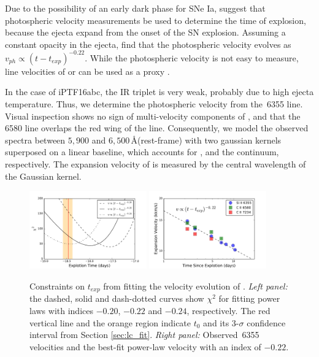 \documentclass[twocolumn]{aastex61}
\begin{document}
Due to the possibility of an early dark phase for SNe Ia, \citet{2014ApJ...784...85P} suggest that photospheric velocity measurements be used to determine the time of explosion, because the ejecta expand from the onset of the SN explosion. Assuming a
constant opacity in the ejecta, \citeauthor{2014ApJ...784...85P} find that the photospheric velocity evolves as
$v_{ph}\propto(t-t_{exp})^{-0.22}$. While the photospheric velocity
is not easy to measure, line velocities of  or 
can be used as a proxy
\citep{2014ApJ...784...85P,2016ApJ...826..144S}.

In the case of iPTF16abc, the  IR triplet is very weak, 
probably due to high ejecta temperature. Thus, we
determine the photospheric velocity from the \,6355 line. Visual
inspection shows no sign of multi-velocity components
of , and that the \,6580 line overlaps the red
wing of the  line. Consequently, we model the observed 
spectra between $5,900$ and $6,500$\,\AA (rest-frame)
with two gaussian kernels superposed on a linear baseline, which
accounts for ,  and the
continuum, respectively. The expansion
velocity of  is measured by the central wavelength
of the  Gaussian kernel.

\begin{figure}[!thb]
  \centering
  \includegraphics[width=0.45\textwidth]{Chi2.pdf}
  \includegraphics[width=0.45\textwidth]{VelocityPlot.pdf}
  \caption{Constraints on $t_{exp}$ from fitting the velocity
    evolution of .
    \textit{Left panel:} the dashed, solid
    and dash-dotted curves show $\chi^2$ for fitting power laws with
    indices $-0.20$, $-0.22$ and $-0.24$, respectively. The red
    vertical line and the orange region indicate $t_0$ and its
    3-$\sigma$ confidence interval from Section
    \ref{sec:lc_fit}.
    \textit{Right panel:} Observed \,6355
    velocities and the best-fit power-law velocity with an index of
    $-0.22$.}
  \label{fig:velocity_t_exp}
\end{figure}
\end{document}
